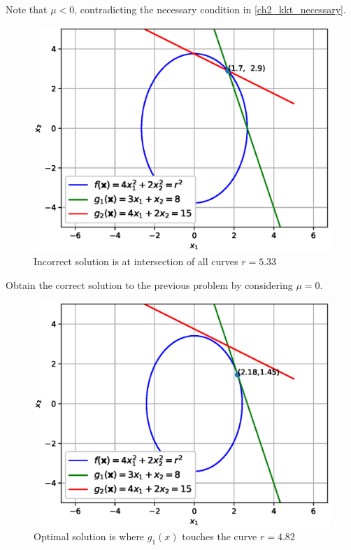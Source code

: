 \documentclass[journal,12pt,twocolumn]{IEEEtran}
\begin{document}
%
Note that $\mu < 0 $, contradicting the necessary condition in \eqref{ch2_kkt_necessary}. 
%
\begin{figure}[h]
\centering
\includegraphics[width=\columnwidth]{./figs/2.12_1.eps}
\caption{ Incorrect solution is at intersection of all curves $r = 5.33$}
\label{fig.2.12}	
\end{figure}
\begin{problem}
Obtain the correct solution to the previous problem by considering $\mu = 0$.
\end{problem}
\begin{figure}[h]
\centering
\includegraphics[width=\columnwidth]{./figs/2.12_2.eps}
\caption{ Optimal solution is where $g_1(x)$ touches the curve $r = 4.82$}
\label{fig.2.13}	
\end{figure}
\end{document}
